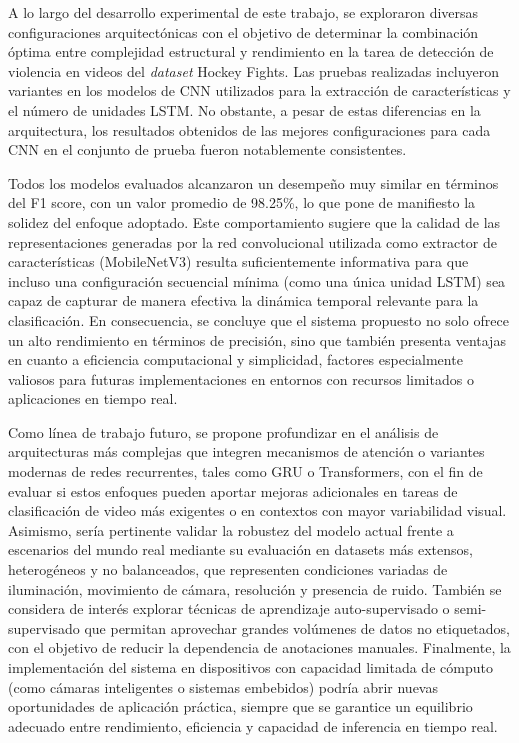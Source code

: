 A lo largo del desarrollo experimental de este trabajo, se 
exploraron diversas configuraciones arquitectónicas con el 
objetivo de determinar la combinación óptima entre complejidad 
estructural y rendimiento en la tarea de detección de violencia 
en videos del \textit{dataset} Hockey Fights. Las pruebas 
realizadas incluyeron variantes en los modelos de CNN utilizados 
para la extracción de características y el número de unidades LSTM. 
No obstante, a pesar de estas diferencias en la arquitectura, 
los resultados obtenidos de las mejores configuraciones para cada 
CNN en el conjunto de prueba fueron notablemente consistentes.

Todos los modelos evaluados alcanzaron un desempeño muy similar en 
términos del F1 score, con un valor promedio de 98.25\%, lo que 
pone de manifiesto la solidez del enfoque adoptado. Este 
comportamiento sugiere que la calidad de las representaciones 
generadas por la red convolucional utilizada como extractor de 
características (MobileNetV3) resulta suficientemente 
informativa para que incluso una configuración secuencial mínima 
(como una única unidad LSTM) sea capaz de capturar de manera 
efectiva la dinámica temporal relevante para la clasificación. 
En consecuencia, se concluye que el sistema propuesto no solo 
ofrece un alto rendimiento en términos de precisión, sino que 
también presenta ventajas en cuanto a eficiencia computacional y 
simplicidad, factores especialmente valiosos para futuras 
implementaciones en entornos con recursos limitados o 
aplicaciones en tiempo real.

Como línea de trabajo futuro, se propone profundizar en el 
análisis de arquitecturas más complejas que integren mecanismos 
de atención o variantes modernas de redes recurrentes, tales 
como GRU o Transformers, con el fin de evaluar si estos enfoques 
pueden aportar mejoras adicionales en tareas de clasificación 
de video más exigentes o en contextos con mayor variabilidad 
visual. Asimismo, sería pertinente validar la robustez del 
modelo actual frente a escenarios del mundo real mediante su 
evaluación en datasets más extensos, heterogéneos y no balanceados, 
que representen condiciones variadas de iluminación, movimiento 
de cámara, resolución y presencia de ruido. También se considera 
de interés explorar técnicas de aprendizaje auto-supervisado 
o semi-supervisado que permitan aprovechar grandes volúmenes de 
datos no etiquetados, con el objetivo de reducir la dependencia 
de anotaciones manuales. Finalmente, la implementación del 
sistema en dispositivos con capacidad limitada de cómputo (como 
cámaras inteligentes o sistemas embebidos) podría abrir nuevas 
oportunidades de aplicación práctica, siempre que se garantice 
un equilibrio adecuado entre rendimiento, eficiencia y capacidad 
de inferencia en tiempo real.